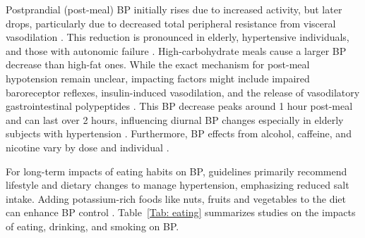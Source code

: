 \documentclass[journal,article,moreauthors]{Definitions/mdpi}
\begin{document}
Postprandial (post-meal) BP initially rises due to increased activity, but later drops, particularly due to decreased total peripheral resistance from visceral vasodilation \citep{Kawano2010}. This reduction is pronounced in elderly, hypertensive individuals, and those with autonomic failure \citep{Jansen1987}. High-carbohydrate meals cause a larger BP decrease than high-fat ones. While the exact mechanism for post-meal hypotension remain unclear, impacting factors might include impaired baroreceptor reflexes, insulin-induced vasodilation, and the release of vasodilatory gastrointestinal polypeptides \citep{Sidery1993}. This BP decrease peaks around 1 hour post-meal and can last over 2 hours, influencing diurnal BP changes especially in elderly subjects with hypertension \citep{Kawano2010}. Furthermore, BP effects from alcohol, caffeine, and nicotine vary by dose and individual \citep{kallioinen2017sources}.

For long-term impacts of eating habits on BP, guidelines primarily recommend lifestyle and dietary changes to manage hypertension, emphasizing reduced salt intake. Adding potassium-rich foods like nuts, fruits and vegetables to the diet can enhance BP control \citep{burnier2019should}. Table~\ref{Tab: eating} summarizes studies on the impacts of eating, drinking, and smoking on BP.
\end{document}
